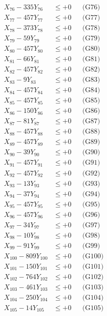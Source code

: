 \documentclass[a4paper,10pt]{article}
\begin{document}
{\begin{align}
X_{76} - 335Y_{76} &\leq +0 && \text{(G76)} \\
X_{77} - 457Y_{77} &\leq +0 && \text{(G77)} \\
X_{78} - 373Y_{78} &\leq +0 && \text{(G78)} \\
X_{79} - 59Y_{79} &\leq +0 && \text{(G79)} \\
X_{80} - 457Y_{80} &\leq +0 && \text{(G80)} \\
\allowbreak
X_{81} - 66Y_{81} &\leq +0 && \text{(G81)} \\
X_{82} - 457Y_{82} &\leq +0 && \text{(G82)} \\
X_{83} - 9Y_{83} &\leq +0 && \text{(G83)} \\
X_{84} - 457Y_{84} &\leq +0 && \text{(G84)} \\
X_{85} - 457Y_{85} &\leq +0 && \text{(G85)} \\
X_{86} - 150Y_{86} &\leq +0 && \text{(G86)} \\
X_{87} - 81Y_{87} &\leq +0 && \text{(G87)} \\
X_{88} - 457Y_{88} &\leq +0 && \text{(G88)} \\
X_{89} - 457Y_{89} &\leq +0 && \text{(G89)} \\
X_{90} - 39Y_{90} &\leq +0 && \text{(G90)} \\
\allowbreak
X_{91} - 457Y_{91} &\leq +0 && \text{(G91)} \\
X_{92} - 457Y_{92} &\leq +0 && \text{(G92)} \\
X_{93} - 13Y_{93} &\leq +0 && \text{(G93)} \\
X_{94} - 37Y_{94} &\leq +0 && \text{(G94)} \\
X_{95} - 457Y_{95} &\leq +0 && \text{(G95)} \\
X_{96} - 457Y_{96} &\leq +0 && \text{(G96)} \\
X_{97} - 34Y_{97} &\leq +0 && \text{(G97)} \\
X_{98} - 10Y_{98} &\leq +0 && \text{(G98)} \\
X_{99} - 91Y_{99} &\leq +0 && \text{(G99)} \\
X_{100} - 809Y_{100} &\leq +0 && \text{(G100)} \\
\allowbreak
X_{101} - 150Y_{101} &\leq +0 && \text{(G101)} \\
X_{102} - 764Y_{102} &\leq +0 && \text{(G102)} \\
X_{103} - 461Y_{103} &\leq +0 && \text{(G103)} \\
X_{104} - 250Y_{104} &\leq +0 && \text{(G104)} \\
X_{105} - 14Y_{105} &\leq +0 && \text{(G105)} \\

\end{align}}
\end{document}

